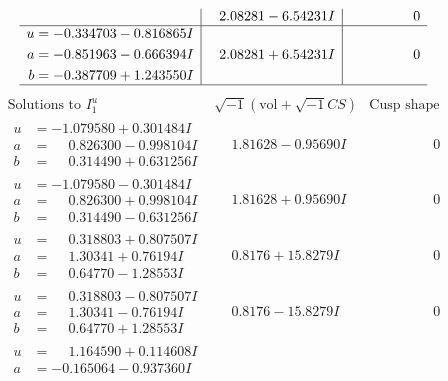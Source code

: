 \documentclass[1p]{elsarticle_modified}
\theoremstyle{definition}
\newcommand{\I}{\sqrt{-1}}
\begin{document}
$$\begin{array}{c|c|c}
 & \phantom{-}2.08281 - 6.54231 I & \phantom{-0.000000 } 0 \\ \hline\begin{aligned}
u &= -0.334703 - 0.816865 I \\
a &= -0.851963 - 0.666394 I \\
b &= -0.387709 + 1.243550 I\end{aligned}
 & \phantom{-}2.08281 + 6.54231 I & \phantom{-0.000000 } 0\\
 \hline 
 \end{array}$$\newpage$$\begin{array}{c|c|c}  
\text{Solutions to }I^u_{1}& \I (\text{vol} + \sqrt{-1}CS) & \text{Cusp shape}\\
 \hline 
\begin{aligned}
u &= -1.079580 + 0.301484 I \\
a &= \phantom{-}0.826300 - 0.998104 I \\
b &= \phantom{-}0.314490 + 0.631256 I\end{aligned}
 & \phantom{-}1.81628 - 0.95690 I & \phantom{-0.000000 } 0 \\ \hline\begin{aligned}
u &= -1.079580 - 0.301484 I \\
a &= \phantom{-}0.826300 + 0.998104 I \\
b &= \phantom{-}0.314490 - 0.631256 I\end{aligned}
 & \phantom{-}1.81628 + 0.95690 I & \phantom{-0.000000 } 0 \\ \hline\begin{aligned}
u &= \phantom{-}0.318803 + 0.807507 I \\
a &= \phantom{-}1.30341 + 0.76194 I \\
b &= \phantom{-}0.64770 - 1.28553 I\end{aligned}
 & \phantom{-}0.8176 + 15.8279 I & \phantom{-0.000000 } 0 \\ \hline\begin{aligned}
u &= \phantom{-}0.318803 - 0.807507 I \\
a &= \phantom{-}1.30341 - 0.76194 I \\
b &= \phantom{-}0.64770 + 1.28553 I\end{aligned}
 & \phantom{-}0.8176 - 15.8279 I & \phantom{-0.000000 } 0 \\ \hline\begin{aligned}
u &= \phantom{-}1.164590 + 0.114608 I \\
a &= -0.165064 - 0.937360 I \\

\end{aligned}
\end{array}$$
\end{document}
